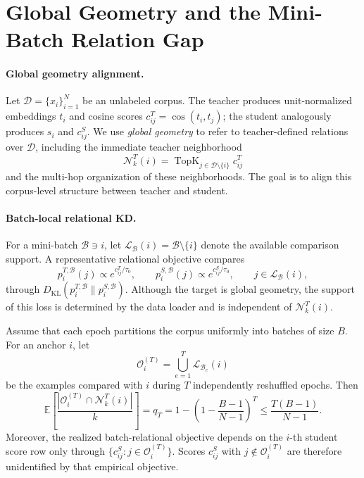 \section{Global Geometry and the Mini-Batch Relation Gap}
\label{sec:theory}

\paragraph{Global geometry alignment.}
Let $\mathcal D=\{x_i\}_{i=1}^{N}$ be an unlabeled corpus. The teacher produces unit-normalized embeddings $t_i$ and cosine scores $c^T_{ij}=\cos(t_i,t_j)$; the student analogously produces $s_i$ and $c^S_{ij}$. We use \emph{global geometry} to refer to teacher-defined relations over $\mathcal D$, including the immediate teacher neighborhood
\begin{equation}
\label{eq:global-neighborhood}
\mathcal N_k^T(i)
=\operatorname{TopK}_{j\in\mathcal D\setminus\{i\}} c^T_{ij}
\end{equation}
and the multi-hop organization of these neighborhoods. The goal is to align this corpus-level structure between teacher and student.

\paragraph{Batch-local relational KD.}
For a mini-batch $\mathcal B\ni i$, let $\mathcal L_{\mathcal B}(i)=\mathcal B\setminus\{i\}$ denote the available comparison support. A representative relational objective compares
\begin{equation}
\label{eq:batchrel}
p_i^{T,\mathcal B}(j)\propto e^{c^T_{ij}/\tau_0},\qquad
p_i^{S,\mathcal B}(j)\propto e^{c^S_{ij}/\tau_0},
\qquad j\in\mathcal L_{\mathcal B}(i),
\end{equation}
through $D_{\mathrm{KL}}(p_i^{T,\mathcal B}\|p_i^{S,\mathcal B})$. Although the target is global geometry, the support of this loss is determined by the data loader and is independent of $\mathcal N_k^T(i)$.

\begin{proposition}
\label{prop:coverage}
Assume that each epoch partitions the corpus uniformly into batches of size $B$. For an anchor $i$, let
\begin{equation}
\mathcal O_i^{(T)}=\bigcup_{e=1}^{T}\mathcal L_{\mathcal B_e}(i)
\end{equation}
be the examples compared with $i$ during $T$ independently reshuffled epochs. Then
\begin{equation}
\label{eq:coverage-exact}
\mathbb E\!\left[
\frac{|\mathcal O_i^{(T)}\cap\mathcal N_k^T(i)|}{k}
\right]
=q_T
=1-\left(1-\frac{B-1}{N-1}\right)^T
\leq\frac{T(B-1)}{N-1}.
\end{equation}
Moreover, the realized batch-relational objective depends on the $i$-th student score row only through $\{c^S_{ij}:j\in\mathcal O_i^{(T)}\}$. Scores $c^S_{ij}$ with $j\notin\mathcal O_i^{(T)}$ are therefore unidentified by that empirical objective.
\end{proposition}

